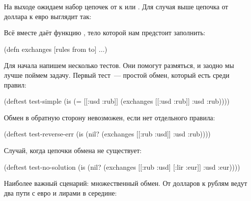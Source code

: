 На выходе ожидаем набор цепочек от  к  или . Для случая выше
цепочка от доллара к евро выглядит так:

\begin{english}
  \begin{clojure}
  \end{clojure}
\end{english}

Всё вместе даёт функцию , тело которой нам предстоит заполнить:

\begin{english}
  \begin{clojure}
(defn exchanges [rules from to]
  ...)
  \end{clojure}
\end{english}

Для начала напишем несколько тестов. Они помогут размяться, и заодно мы лучше
поймем задачу. Первый тест~--- простой обмен, который есть среди правил:

\begin{english}
  \begin{clojure}
(deftest test-simple
  (is (= [[:usd :rub]]
         (exchanges [[:usd :rub]]
                    :usd
                    :rub))))
  \end{clojure}
\end{english}

Обмен в обратную сторону невозможен, если нет отдельного правила:

\begin{english}
  \begin{clojure}
(deftest test-reverse-err
  (is (nil? (exchanges [[:rub :usd]]
                       :usd
                       :rub))))
  \end{clojure}
\end{english}

Случай, когда цепочки обмена не существует:

\begin{english}
  \begin{clojure}
(deftest test-no-solution
  (is (nil? (exchanges [[:rub :usd]
                        [:lir :eur]]
                       :usd
                       :eur))))
  \end{clojure}
\end{english}

Наиболее важный сценарий: множественный обмен. От долларов к рублям ведут два
пути с евро и лирами в середине:

